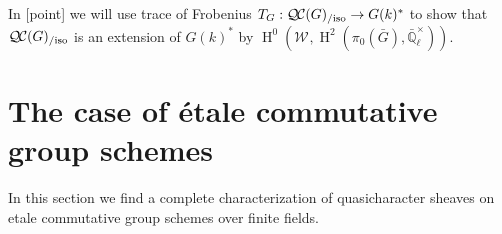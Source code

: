 \documentclass{amsart}
\theoremstyle{plain}
\theoremstyle{definition}
\theoremstyle{remark}
\newcommand{\EE}{\mathbb{\bar Q}_\ell}
\newcommand{\bFq}{\bar{k}}
\newcommand{\Fq}{k}
\newcommand{\EEx}{\EE^\times}
\newcommand{\Weil}[1]{\mathcal{W}_{#1}}
\DeclareMathOperator{\Gal}{Gal}
\DeclareMathOperator{\Hh}{H}
\newcommand{\QC}{{\mathcal{Q\hskip-0.8pt C}}}
\newcommand{\QCiso}[1]{\QC(#1)_{/\text{iso}}}
\newcommand{\TrFrob}[1]{T_{#1}}
\begin{document}
In [point] we will use trace of Frobenius $\TrFrob{G} : \QCiso{G} \to G(\Fq)^*$ to show that $\QCiso{G}$ is an extension of $G(\Fq)^*$ by $\Hh^0(\Weil{},\Hh^2(\pi_0({\bar G}),\EEx))$.


\section{The case of \'etale commutative group schemes} \label{sec:etale}



In this section we find a complete characterization of quasicharacter sheaves on etale commutative group schemes over finite fields.
\end{document}
